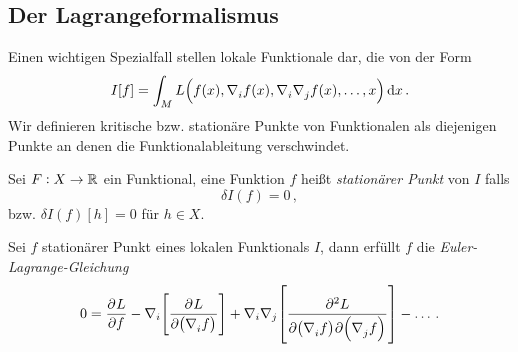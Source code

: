 \subsection{Der Lagrangeformalismus}
Einen wichtigen Spezialfall stellen lokale Funktionale dar, die von der Form 
\begin{equation}
I[f]=\int_M L\left(f(x),\tensor{\nabla}{_i}
f(x),\tensor{\nabla}{_i}\tensor{\nabla}{_j} f(x),\dots,x\right)\dif x\,.
\end{equation}
Wir definieren kritische bzw. stationäre Punkte von Funktionalen als diejenigen
Punkte an denen die Funktionalableitung verschwindet. 
\begin{definition}
Sei $F:X\to\mathbb{R}$ ein Funktional, eine Funktion $f$ heißt \emph{stationärer
Punkt} von $I$ falls
\begin{equation}
\delta {I}(f)=0\,,
\end{equation} 
bzw. $\delta {I}(f)[h]=0$ für $h\in X$.
\end{definition}
\begin{lemma}
Sei $f$ stationärer Punkt eines lokalen Funktionals $I$,
dann erfüllt $f$ die \emph{Euler-Lagrange-Gleichung}
\begin{equation}
0=\dpd{L}{f}-\nabla_i\left[\dpd{L}{\left(\tensor{\nabla}{_i}f\right)}\right]
+\nabla_i\nabla_j\left[\dmd{L}{2}{\left(\tensor{\nabla}{_i}f\right)}{}{\left(\tensor{\nabla}{_j}f\right)}{}
\right]-\dots\,.
\end{equation}
\end{lemma}
